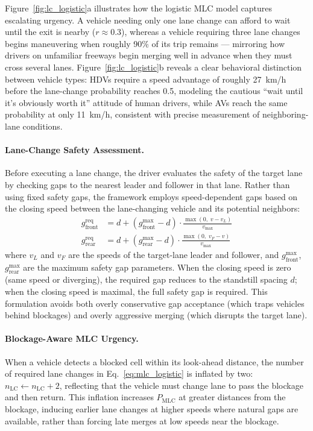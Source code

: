 \documentclass[review,authoryear]{elsarticle}
\begin{document}
Figure~\ref{fig:lc_logistic}a illustrates how the logistic MLC model captures escalating urgency. A vehicle needing only one lane change can afford to wait until the exit is nearby ($r \approx 0.3$), whereas a vehicle requiring three lane changes begins maneuvering when roughly 90\% of its trip remains --- mirroring how drivers on unfamiliar freeways begin merging well in advance when they must cross several lanes. Figure~\ref{fig:lc_logistic}b reveals a clear behavioral distinction between vehicle types: HDVs require a speed advantage of roughly 27~km/h before the lane-change probability reaches 0.5, modeling the cautious ``wait until it's obviously worth it'' attitude of human drivers, while AVs reach the same probability at only 11~km/h, consistent with precise measurement of neighboring-lane conditions.

\paragraph{Lane-Change Safety Assessment.}
Before executing a lane change, the driver evaluates the safety of the target lane by checking gaps to the nearest leader and follower in that lane. Rather than using fixed safety gaps, the framework employs speed-dependent gaps based on the closing speed between the lane-changing vehicle and its potential neighbors:
\begin{align}
    g_{\text{front}}^{\text{req}} &= d + (g_{\text{front}}^{\max} - d) \cdot \frac{\max(0,\; v - v_L)}{v_{\max}} \label{eq:front_gap} \\
    g_{\text{rear}}^{\text{req}} &= d + (g_{\text{rear}}^{\max} - d) \cdot \frac{\max(0,\; v_F - v)}{v_{\max}} \label{eq:rear_gap}
\end{align}
where $v_L$ and $v_F$ are the speeds of the target-lane leader and follower, and $g_{\text{front}}^{\max}$, $g_{\text{rear}}^{\max}$ are the maximum safety gap parameters. When the closing speed is zero (same speed or diverging), the required gap reduces to the standstill spacing $d$; when the closing speed is maximal, the full safety gap is required. This formulation avoids both overly conservative gap acceptance (which traps vehicles behind blockages) and overly aggressive merging (which disrupts the target lane).

\paragraph{Blockage-Aware MLC Urgency.}
When a vehicle detects a blocked cell within its look-ahead distance, the number of required lane changes in Eq.~\eqref{eq:mlc_logistic} is inflated by two: $n_{\text{LC}} \leftarrow n_{\text{LC}} + 2$, reflecting that the vehicle must change lane to pass the blockage and then return. This inflation increases $P_{\text{MLC}}$ at greater distances from the blockage, inducing earlier lane changes at higher speeds where natural gaps are available, rather than forcing late merges at low speeds near the blockage.
\end{document}
